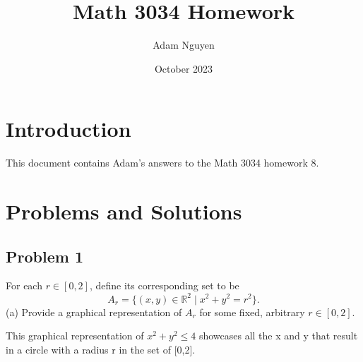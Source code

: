 \documentclass{article}
\title{Math 3034 Homework}
\author{Adam Nguyen}
\date{October 2023}
\begin{document}
\maketitle

\section{Introduction}
This document contains Adam's answers to the Math 3034 homework 8.

\section{Problems and Solutions}

\subsection*{Problem 1}
For each \( r \in [0, 2] \), define its corresponding set to be 
\[ 
A_r = \{(x, y) \in \mathbb{R}^2 \mid x^2 + y^2 = r^2 \}.
\]
(a) Provide a graphical representation of \( A_r \) for some fixed, arbitrary \( r \in [0, 2] \).


This graphical representation of \(x^2 + y^2 \leq 4\) showcases all the x and y that result in a circle with a radius r in the set of [0,2].

\vspace{3cm} %
\end{document}
